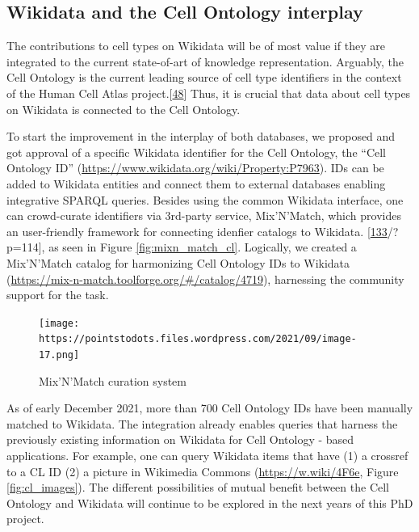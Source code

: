 \hypertarget{wikidata-and-the-cell-ontology-interplay}{%
\subsection{Wikidata and the Cell Ontology interplay}\label{wikidata-and-the-cell-ontology-interplay}}

The contributions to cell types on Wikidata will be of most value if they are integrated to the current state-of-art of knowledge representation.
Arguably, the Cell Ontology is the current leading source of cell type identifiers in the context of the Human Cell Atlas project.{[}\protect\hyperlink{ref-qT8WxqjA}{48}{]}
Thus, it is crucial that data about cell types on Wikidata is connected to the Cell Ontology.

To start the improvement in the interplay of both databases, we proposed and got approval of a specific Wikidata identifier for the Cell Ontology, the ``Cell Ontology ID'' (\url{https://www.wikidata.org/wiki/Property:P7963}).
IDs can be added to Wikidata entities and connect them to external databases enabling integrative SPARQL queries.
Besides using the common Wikidata interface, one can crowd-curate identifiers via 3rd-party service, Mix'N'Match, which provides an user-friendly framework for connecting idenfier catalogs to Wikidata. {[}\protect\hyperlink{ref-JgiKEEdq}{133}/?p=114{]}, as seen in Figure \ref{fig:mixn_match_cl}.
Logically, we created a Mix'N'Match catalog for harmonizing Cell Ontology IDs to Wikidata (\url{https://mix-n-match.toolforge.org/\#/catalog/4719}), harnessing the community support for the task.

\begin{figure}
\hypertarget{fig:mixnmatch_cl}{%
\centering
\texttt{[image: https://pointstodots.files.wordpress.com/2021/09/image-17.png]}
\caption{Mix'N'Match curation system}\label{fig:mixnmatch_cl}
}
\end{figure}

As of early December 2021, more than 700 Cell Ontology IDs have been manually matched to Wikidata.
The integration already enables queries that harness the previously existing information on Wikidata for Cell Ontology - based applications.
For example, one can query Wikidata items that have (1) a crossref to a CL ID (2) a picture in Wikimedia Commons (\url{https://w.wiki/4F6e}, Figure \ref{fig:cl_images}).
The different possibilities of mutual benefit between the Cell Ontology and Wikidata will continue to be explored in the next years of this PhD project.

